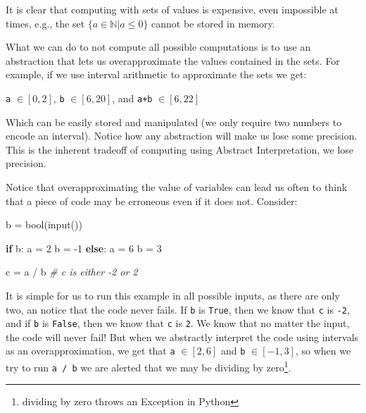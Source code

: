 \documentclass[
11pt, %
english, %
singlespacing, %
headsepline, %
]{MastersDoctoralThesis} %
\newenvironment{Shaded}{}{}
\newcommand{\BuiltInTok}[1]{#1}
\newcommand{\CommentTok}[1]{\textcolor[rgb]{0.38,0.63,0.69}{\textit{#1}}}
\newcommand{\ControlFlowTok}[1]{\textcolor[rgb]{0.00,0.44,0.13}{\textbf{#1}}}
\newcommand{\DecValTok}[1]{\textcolor[rgb]{0.25,0.63,0.44}{#1}}
\newcommand{\NormalTok}[1]{#1}
\newcommand{\OperatorTok}[1]{\textcolor[rgb]{0.40,0.40,0.40}{#1}}
\begin{document}
It is clear that computing with sets of values is expensive, even
impossible at times, e.g., the set \(\{a \in \mathbb{N} | a \leq 0\}\)
cannot be stored in memory.

What we can do to not compute all possible computations is to use an
abstraction that lets us overapproximate the values contained in the
sets. For example, if we use interval arithmetic to approximate the sets
we get:

\texttt{a} \(\in \left[0, 2\right]\), \texttt{b}
\(\in \left[6, 20\right]\), and \texttt{a+b} \(\in \left[6, 22\right]\)

Which can be easily stored and manipulated (we only require two numbers
to encode an interval). Notice how any abstraction will make us lose
some precision. This is the inherent tradeoff of computing using
Abstract Interpretation, we lose precision.

Notice that overapproximating the value of variables can lead us often
to think that a piece of code may be erroneous even if it does not.
Consider:

\begin{Shaded}
\begin{Highlighting}[]
\NormalTok{b }\OperatorTok{=} \BuiltInTok{bool}\NormalTok{(}\BuiltInTok{input}\NormalTok{())}

\ControlFlowTok{if}\NormalTok{ b:}
\NormalTok{  a }\OperatorTok{=} \DecValTok{2}
\NormalTok{  b }\OperatorTok{=} \DecValTok{-1}
\ControlFlowTok{else}\NormalTok{:}
\NormalTok{  a }\OperatorTok{=} \DecValTok{6}
\NormalTok{  b }\OperatorTok{=} \DecValTok{3}

\NormalTok{c }\OperatorTok{=}\NormalTok{ a }\OperatorTok{/}\NormalTok{ b  }\CommentTok{# c is either -2 or 2}
\end{Highlighting}
\end{Shaded}

It is simple for us to run this example in all possible inputs, as there
are only two, an notice that the code never fails. If \texttt{b} is
\texttt{True}, then we know that \texttt{c} is \texttt{-2}, and if
\texttt{b} is \texttt{False}, then we know that \texttt{c} is
\texttt{2}. We know that no matter the input, the code will never fail!
But when we abstractly interpret the code using intervals as an
overapproximation, we get that \texttt{a} \(\in [2,6]\) and \texttt{b}
\(\in [-1,3]\), so when we try to run \texttt{a\ /\ b} we are alerted
that we may be dividing by zero\footnote{dividing by zero throws an
  Exception in Python}.
\end{document}
